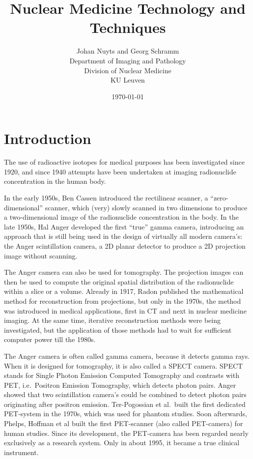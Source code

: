 \documentclass[11pt,oneside]{article}
\title{Nuclear Medicine Technology and Techniques}
\author{Johan Nuyts and Georg Schramm\\[3mm]
        Department of Imaging and Pathology \\
        Division of Nuclear Medicine \\
        KU Leuven}
\date{\today}
\begin{document}
           
\maketitle

\tableofcontents

\section{Introduction}

The use of radioactive isotopes for medical purposes has been investigated
since 1920, and since 1940 attempts have been undertaken at imaging
radionuclide concentration in the human body.

In the early 1950s, Ben Cassen introduced the rectilinear scanner, a
``zero-dimensional'' scanner, which (very) slowly scanned in two
dimensions to produce a two-dimensional image of the radionuclide
concentration in the body. In the late 1950s, Hal Anger developed the
first ``true'' gamma camera, introducing an approach that is still
being used in the design of virtually all modern camera's: the Anger
scintillation camera, a 2D planar detector to produce a 2D projection
image without scanning.

The Anger camera can also be used for tomography. The projection images can
then be used to compute the original spatial distribution of the radionuclide
within a slice or a volume. Already in 1917, Radon published the mathematical
method for reconstruction from projections, but only in the 1970s, the method
was introduced in medical applications, first in CT and next in nuclear
medicine imaging. At the same time, iterative reconstruction methods were
being investigated, but the application of those methods had to wait for
sufficient computer power till the 1980s.

The Anger camera is often called gamma camera, because it detects gamma rays.
When it is designed for tomography, it is also called a SPECT camera. SPECT
stands for Single Photon Emission Computed Tomography and contrasts with PET,
i.e.\ Positron Emission Tomography, which detects photon pairs. Anger showed
that two scintillation camera's could be combined to detect photon pairs
originating after positron emission. Ter-Pogossian et al.\ built the first
dedicated PET-system in the 1970s, which was used for phantom studies.  Soon
afterwards, Phelps, Hoffman et al built the first PET-scanner (also called
PET-camera) for human studies. Since its development,
the PET-camera has been regarded nearly exclusively as a research system.
Only in about 1995, it became a true clinical instrument.
\end{document}
